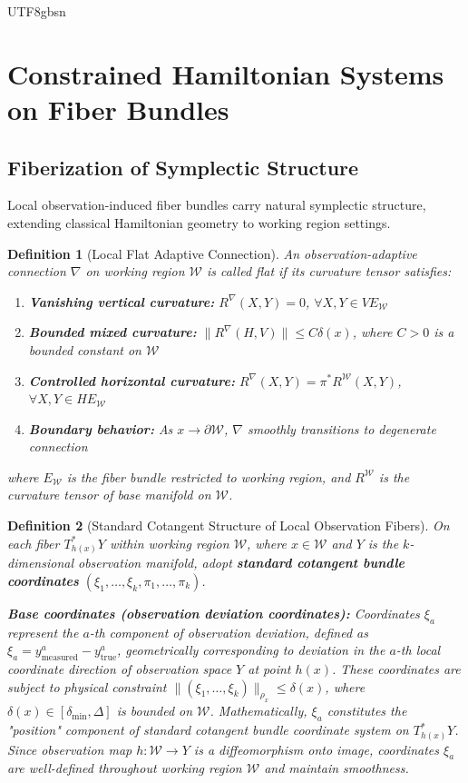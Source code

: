 \documentclass[a4paper,12pt]{extarticle}
\newtheorem{definition}{Definition}
\theoremstyle{definition}
\begin{document}
\begin{CJK}{UTF8}{gbsn}
\section{Constrained Hamiltonian Systems on Fiber Bundles}



\subsection{Fiberization of Symplectic Structure}\label{subsec:sym_fiber}

Local observation-induced fiber bundles carry natural symplectic structure, extending classical Hamiltonian geometry to working region settings.

\begin{definition}[Local Flat Adaptive Connection]
An observation-adaptive connection $\nabla$ on working region $\mathcal{W}$ is called flat if its curvature tensor satisfies:
\begin{enumerate}
\item \textbf{Vanishing vertical curvature:} $R^{\nabla}(X,Y) = 0$, $\forall X,Y \in VE_{\mathcal{W}}$
\item \textbf{Bounded mixed curvature:} $\|R^{\nabla}(H,V)\| \leq C\delta(x)$, where $C > 0$ is a bounded constant on $\mathcal{W}$
\item \textbf{Controlled horizontal curvature:} $R^{\nabla}(X,Y) = \pi^*R^{\mathcal{W}}(X,Y)$, $\forall X,Y \in HE_{\mathcal{W}}$
\item \textbf{Boundary behavior:} As $x \to \partial \mathcal{W}$, $\nabla$ smoothly transitions to degenerate connection
\end{enumerate}
where $E_{\mathcal{W}}$ is the fiber bundle restricted to working region, and $R^{\mathcal{W}}$ is the curvature tensor of base manifold on $\mathcal{W}$.
\end{definition}

\begin{definition}[Standard Cotangent Structure of Local Observation Fibers]
On each fiber $T^*_{h(x)}Y$ within working region $\mathcal{W}$, where $x \in \mathcal{W}$ and $Y$ is the $k$-dimensional observation manifold, adopt \textbf{standard cotangent bundle coordinates} $(\xi_1,\ldots,\xi_k,\pi_1,\ldots,\pi_k)$.

\textbf{Base coordinates (observation deviation coordinates):}
Coordinates $\xi_a$ represent the $a$-th component of observation deviation, defined as $\xi_a = y^a_{\text{measured}} - y^a_{\text{true}}$, geometrically corresponding to deviation in the $a$-th local coordinate direction of observation space $Y$ at point $h(x)$. These coordinates are subject to physical constraint $\|(\xi_1,\ldots,\xi_k)\|_{\rho_x} \leq \delta(x)$, where $\delta(x) \in [\delta_{\min}, \Delta]$ is bounded on $\mathcal{W}$. Mathematically, $\xi_a$ constitutes the "position" component of standard cotangent bundle coordinate system on $T^*_{h(x)}Y$. Since observation map $h: \mathcal{W} \to Y$ is a diffeomorphism onto image, coordinates $\xi_a$ are well-defined throughout working region $\mathcal{W}$ and maintain smoothness.


\end{definition}
\end{CJK}
\end{document}
